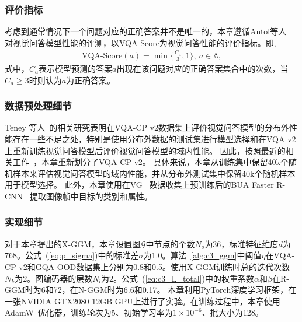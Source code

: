 


\subsubsection{评价指标}
考虑到通常情况下一个问题对应的正确答案并不是唯一的，本章遵循Antol等人~\cite{antol2015vqa} 对视觉问答模型性能的评测，以VQA-Score为视觉问答性能的评价指标。即,
\begin{equation}
\begin{aligned}
\text{VQA-Score} (a) = \min \{\frac{C_a}{3}, 1\}, ~a \in \mathbb{A},  
\end{aligned}
\end{equation} 
式中，$C_a$表示模型预测的答案$a$出现在该问题对应的正确答案集合中的次数，当$C_a \ge 3$时则认为$a$为正确答案。


\subsubsection{数据预处理细节}
Teney 等人~\cite{teney2020value}的相关研究表明在VQA-CP v2数据集上评价视觉问答模型的分布外性能存在一些不足之处，特别是使用分布外数据的测试集进行模型选择和在VQA v2上重新训练视觉问答模型后评价视觉问答模型的域内性能。
因此，按照最近的相关工作~\cite{teney2019actively,teney2020unshuffling,teney2020learning,clark2020learning}，本章重新划分了VQA-CP v2。
具体来说，本章从训练集中保留40k个随机样本来评估视觉问答模型的域内性能，并从分布外测试集中保留40k个随机样本用于模型选择。
此外，本章使用在VG~\cite{krishna2017visual} 数据收集上预训练后的BUA Faster R-CNN~\cite{anderson2018bottom} 提取图像帧中目标的类别和属性。


\subsubsection{实现细节}
对于本章提出的X-GGM，本章设置图$\mathcal{G}$中节点的个数$N_o$为36，标准特征维度$d$为768。公式~(\ref{eq:p_sigma})中的标准差$\sigma$为1.0。算法~\ref{alg:c3_ggm}中阈值$\eta$在VQA-CP v2和GQA-OOD数据集上分别为0.8和0.5。使用X-GGM训练时总的迭代次数$N_k$为2。图编码器的层数$N_l$为2。公式~(\ref{eq:c3_L_total})中的权重系数$\alpha$和$\beta$在R-GGM时为6和72，在N-GGM时为6.6和0.17。
本章利用PyTorch深度学习框架，在一张NVIDIA GTX2080 12GB GPU上进行了实验。在训练过程中，本章使用AdamW~\cite{loshchilov2017decoupled}优化器，训练轮次为5、初始学习率为$1\times 10^{-6}$、批大小为128。




